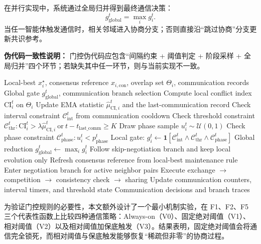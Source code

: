 \documentclass[conference]{IEEEtran}
\begin{document}
在并行实现中，系统通过全局归并得到最终通信决策：
\[
g_{\mathrm{global}}^t=\max_i g_i^t.
\]
当任一智能体触发通信时，相关邻域进入协商分支；否则直接沿“跳过协商”分支更新共识参考。

\textbf{伪代码一致性说明：} 门控伪代码应包含“间隔约束 + 阈值判定 + 阶段采样 + 全局归并”四个环节；若缺失其中任一环节，则与当前实现不一致。

\begin{algorithm}[t]
  \footnotesize
  \caption{CI-Gated Communication with Phase Sampling (Abstract)}
  \label{alg:ci_gating}
  \begin{algorithmic}[1]
  \Require Local-best $x_i^\star$, consensus reference $x_{i,\mathrm{con}}$, overlap set $\Theta_i$, communication records
  \Ensure Global gate $g_{\mathrm{global}}^t$, communication branch selection
    \State Compute local conflict index $\mathrm{CI}_i^t$ on $\Theta_i$
    \State Update EMA statistic $\hat{\mu}_{\mathrm{CI},i}^t$ and the last-communication record
    \State Check interval constraint $\mathcal{C}_{\mathrm{int}}^t$ from communication cooldown
    \State Check threshold constraint $\mathcal{C}_{\mathrm{thr}}^t: \mathrm{CI}_i^t > \lambda\hat{\mu}_{\mathrm{CI},i}^t\ \text{or}\ t-t_{\mathrm{last\_comm}}\ge K$
    \State Draw phase sample $u_i^t\sim\mathcal{U}(0,1)$
    \State Check phase constraint $\mathcal{C}_{\mathrm{phase}}^t: u_i^t<p_{\mathrm{phase}}^t$
    \State Local gate:
    \Statex \hspace{1.5em}$g_i^t\gets \mathbf{1}\!\left[\mathcal{C}_{\mathrm{int}}^t\land \mathcal{C}_{\mathrm{thr}}^t\land \mathcal{C}_{\mathrm{phase}}^t\right]$
    \State Global reduction $g_{\mathrm{global}}^t\gets \max_i g_i^t$
      \State Follow skip-negotiation branch and keep local evolution only
      \State Refresh consensus reference from local-best maintenance rule
    \Else
      \State Enter negotiation branch for active neighbor pairs
      \State Execute exchange $\rightarrow$ competition $\rightarrow$ consistency check $\rightarrow$ sharing
    \EndIf
    \State Update communication counters, interval timers, and threshold state
  \EndFor
  \State \Return Communication decisions and branch traces
  \end{algorithmic}
  \end{algorithm}


为验证门控规则的必要性，本文额外设计了一个最小机制实验，在 F1、F2、F5 三个代表性函数上比较四种通信策略：Always-on（V0）、固定绝对阈值（V1）、相对阈值（V2）以及相对阈值加保底触发（V3）。结果表明，固定绝对阈值会将通信完全锁死，而相对阈值与保底触发能够恢复“稀疏但非零”的协商过程。
\end{document}
